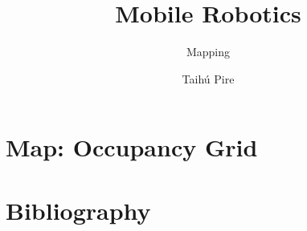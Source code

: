 \documentclass[aspectratio=169,compress]{beamer}
\subtitle{Mapping}
\title{Mobile Robotics}
\author{Taihú Pire}
\institute{Robotics Laboratory}
\date{}
\begin{document}
	\frame{\titlepage}

	\section{Map: Occupancy Grid}
	

	\section{Bibliography}
	
\end{document}
